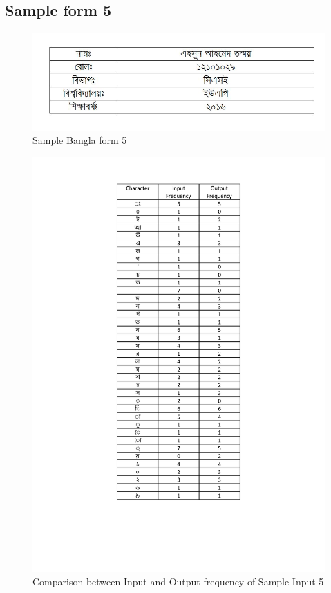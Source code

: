 \subsection{Sample form 5}
\begin{figure}[H]
\centering
\includegraphics[width=1\textwidth]{formBen05.JPG}
\caption {Sample Bangla form 5}
\label {fig:FormBan5}
\end{figure}
\begin{figure}[H]
\centering
\includegraphics[width=1\textwidth \frame]{BTform5}
\caption {Comparison between Input and Output frequency of Sample Input 5}
\label {fig:BTform5}
\end{figure}
